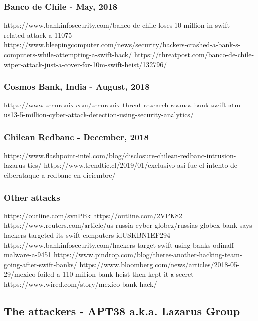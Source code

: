 \documentclass[12pt]{article}
\begin{document}
    \subsubsection{Banco de Chile - May, 2018}
        
        https://www.bankinfosecurity.com/banco-de-chile-loses-10-million-in-swift-related-attack-a-11075
        https://www.bleepingcomputer.com/news/security/hackers-crashed-a-bank-s-computers-while-attempting-a-swift-hack/
        https://threatpost.com/banco-de-chile-wiper-attack-just-a-cover-for-10m-swift-heist/132796/
        
    \subsubsection{Cosmos Bank, India - August, 2018}
        
        https://www.securonix.com/securonix-threat-research-cosmos-bank-swift-atm-us13-5-million-cyber-attack-detection-using-security-analytics/
   
    \subsubsection{Chilean Redbanc - December, 2018}
        
        https://www.flashpoint-intel.com/blog/disclosure-chilean-redbanc-intrusion-lazarus-ties/
        https://www.trendtic.cl/2019/01/exclusivo-asi-fue-el-intento-de-ciberataque-a-redbanc-en-diciembre/
        
    \subsubsection*{Other attacks}
        
        https://outline.com/svnPBk 
        https://outline.com/2VPK82
        https://www.reuters.com/article/us-russia-cyber-globex/russias-globex-bank-says-hackers-targeted-its-swift-computers-idUSKBN1EF294 
        https://www.bankinfosecurity.com/hackers-target-swift-using-banks-odinaff-malware-a-9451
        https://www.pindrop.com/blog/theres-another-hacking-team-going-after-swift-banks/
        https://www.bloomberg.com/news/articles/2018-05-29/mexico-foiled-a-110-million-bank-heist-then-kept-it-a-secret
        https://www.wired.com/story/mexico-bank-hack/
    
    \subsection{The attackers - APT38 a.k.a. Lazarus Group}
        
\end{document}
